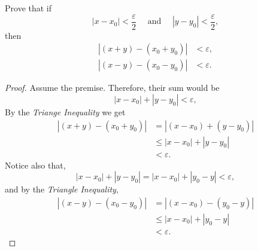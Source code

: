\begin{exercise}[\textbf{20}]Prove that if
     \begin{equation*}
         |x-x_0|<\frac{\varepsilon}{2} \quad \text{ and } \quad |y-y_0|< \frac{\varepsilon}{2},
     \end{equation*}
     then
     \begin{align*}
         |(x+y) - (x_0 +y_0)| &< \varepsilon , \\
         |(x-y) - (x_0 - y_0)| &< \varepsilon .     
     \end{align*}
     \begin{proof}Assume the premise. Therefore, their sum would be 
          \begin{equation*}
              |x-x_0|+|y-y_0| < \varepsilon,
          \end{equation*}
          By the \emph{Triange Inequality} we get
          \begin{align*}
              |(x+y)-(x_0+y_0)|&=|(x-x_0)+(y-y_0) | \\
              &\leq |x-x_0|+|y-y_0| \\
              &< \varepsilon.
          \end{align*}
          Notice also that,
          \begin{equation*}
            |x-x_0|+|y-y_0|=|x-x_0|+|y_0 -y| < \varepsilon,
          \end{equation*}
          and by the \emph{Triangle Inequality},
          \begin{align*}
              |(x-y)-(x_0 -y_0) | &=|(x-x_0)-(y_0-y) | \\
              &\leq |x-x_0|+|y_0 -y| \\
              &< \varepsilon.
          \end{align*}
     \end{proof}
\end{exercise}